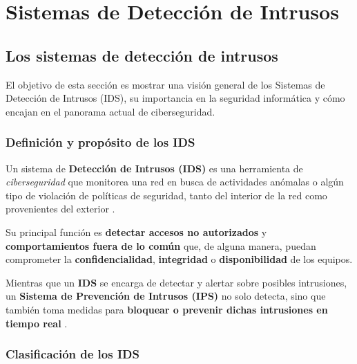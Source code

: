 \documentclass[11pt,a4paper,twoside]{report}
\begin{document}
\chapter{Sistemas de Detección de Intrusos}

\section{Los sistemas de detección de intrusos}

El objetivo de esta sección es mostrar una visión general de los Sistemas de Detección de Intrusos (IDS), su importancia en la seguridad informática y cómo encajan en el panorama actual de ciberseguridad.

\subsection{Definición y propósito de los IDS}

Un sistema de \textbf{Detección de Intrusos (IDS)} es una herramienta de \textit{ciberseguridad} que monitorea una red en busca de actividades anómalas o algún tipo de violación de políticas de seguridad, tanto del interior de la red como provenientes del exterior \cite{cichonski2012guide}.\newline

Su principal función es \textbf{detectar accesos no autorizados} y \textbf{comportamientos fuera de lo común} que, de alguna manera, puedan comprometer la \textbf{confidencialidad}, \textbf{integridad} o \textbf{disponibilidad} de los equipos.\newline

Mientras que un \textbf{IDS} se encarga de detectar y alertar sobre posibles intrusiones, un \textbf{Sistema de Prevención de Intrusos (IPS)} no solo detecta, sino que también toma medidas para \textbf{bloquear o prevenir dichas intrusiones en tiempo real} \cite{abbas2023ids}.

\subsection{Clasificación de los IDS}
\end{document}
